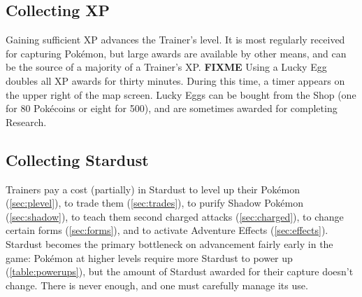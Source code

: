 \subsection{Collecting XP}
\label{subsec:getxp}
Gaining sufficient XP advances the Trainer's level.
It is most regularly received for capturing Pokémon, but large awards are
  available by other means, and can be the source of a majority of a Trainer's XP.
  \textbf{FIXME}
Using a Lucky Egg doubles all XP awards for thirty minutes.
During this time, a timer appears on the upper right of the map screen.
Lucky Eggs can be bought from the Shop (one for 80 Pokécoins or eight for 500),
  and are sometimes awarded for completing Research.

%
\subsection{Collecting Stardust}
\label{subsec:getdust}
Trainers pay a cost (partially) in Stardust
  to level up their Pokémon (\autoref{sec:plevel}),
  to trade them (\autoref{sec:trades}),
  to purify Shadow Pokémon (\autoref{sec:shadow}),
  to teach them second charged attacks (\autoref{sec:charged}),
  to change certain forms (\autoref{sec:forms}),
  and to activate Adventure Effects (\autoref{sec:effects}).
Stardust becomes the primary bottleneck on advancement fairly early in the game:
  Pokémon at higher levels require more Stardust to power up (\autoref{table:powerups}),
  but the amount of Stardust awarded for their capture doesn't change.
There is never enough, and one must carefully manage its use.


